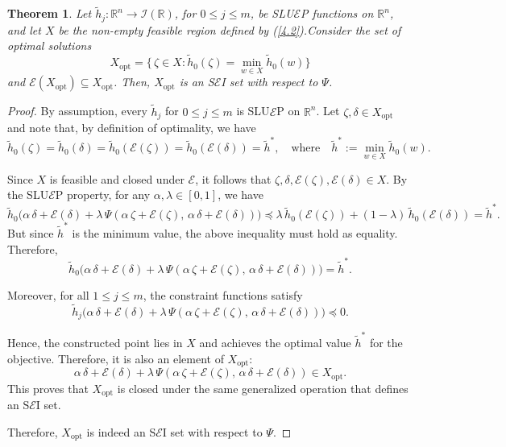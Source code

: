 \documentclass[12pt, reqno]{amsart}
\newtheorem{theorem}{Theorem}[section]
\theoremstyle{definition}
\theoremstyle{remark}
\numberwithin{equation}{section}
\begin{document}
\begin{theorem}
Let $\tilde{h}_{j}: \mathbb{R}^{n} \rightarrow \mathcal{I}(\mathbb{R})$, for $0 \leq j \leq m$, be SLU$\mathcal{E}$P functions on $\mathbb{R}^{n}$, and let $X$ be the non-empty feasible region defined by \emph{(\ref{4.2})}.Consider the set of optimal solutions 
\[
X_{\text{opt}} = \big\{\, \zeta \in X : \tilde{h}_{0}(\zeta) = \min_{w \in X} \tilde{h}_{0}(w) \big\}
\] and $\mathcal{E}(X_{\text{opt}})\subseteq X_{\text{opt}}$. Then, $X_{\text{opt}}$
is an S$\mathcal{E}$I set with respect to $\Psi$.
\end{theorem}

\begin{proof}
By assumption, every $\tilde{h}_{j}$ for $0 \leq j \leq m$ is SLU$\mathcal{E}$P on $\mathbb{R}^{n}$. Let $\mathit{\zeta}, \mathit{\delta} \in X_{\text{opt}}$ and note that, by definition of optimality, we have
\[
\tilde{h}_{0}(\mathit{\zeta}) = \tilde{h}_{0}(\mathit{\delta}) = \tilde{h}_{0}(\mathcal{E}(\mathit{\zeta})) = \tilde{h}_{0}(\mathcal{E}(\mathit{\delta})) = \tilde{h}^{*},
\quad \text{where} \quad 
\tilde{h}^{*} := \min_{w \in X} \tilde{h}_{0}(w).
\]

Since $X$ is feasible and closed under $\mathcal{E}$, it follows that
$\mathit{\zeta}, \mathit{\delta}, \mathcal{E}(\mathit{\zeta}), \mathcal{E}(\mathit{\delta}) \in X$. By the SLU$\mathcal{E}$P property, for any $\alpha, \lambda \in [0,1]$, we have
\[
\tilde{h}_{0}\big( 
\alpha\, \mathit{\delta} + \mathcal{E}(\mathit{\delta})
+ \lambda\, \Psi(
\alpha\, \mathit{\zeta} + \mathcal{E}(\mathit{\zeta}),
\, \alpha\, \mathit{\delta} + \mathcal{E}(\mathit{\delta})
)
\big)
\preceq
\lambda\, \tilde{h}_{0}(\mathcal{E}(\mathit{\zeta})) + (1-\lambda)\, \tilde{h}_{0}(\mathcal{E}(\mathit{\delta})) 
= \tilde{h}^{*}.
\]
But since $\tilde{h}^{*}$ is the minimum value, the above inequality must hold as equality. Therefore,
\[
\tilde{h}_{0}\big(
\alpha\, \mathit{\delta} + \mathcal{E}(\mathit{\delta}) 
+ \lambda\, \Psi(
\alpha\, \mathit{\zeta} + \mathcal{E}(\mathit{\zeta}),
\, \alpha\, \mathit{\delta} + \mathcal{E}(\mathit{\delta})
)
\big) = \tilde{h}^{*}.
\]

Moreover, for all $1 \leq j \leq m$, the constraint functions satisfy
\[
\tilde{h}_{j}\big(
\alpha\, \mathit{\delta} + \mathcal{E}(\mathit{\delta})
+ \lambda\, \Psi(
\alpha\, \mathit{\zeta} + \mathcal{E}(\mathit{\zeta}),
\, \alpha\, \mathit{\delta} + \mathcal{E}(\mathit{\delta})
)
\big) \preceq 0.
\]

Hence, the constructed point lies in $X$ and achieves the optimal value $\tilde{h}^{*}$ for the objective. Therefore, it is also an element of $X_{\text{opt}}$:
\[
\alpha\, \mathit{\delta} + \mathcal{E}(\mathit{\delta})
+ \lambda\, \Psi(
\alpha\, \mathit{\zeta} + \mathcal{E}(\mathit{\zeta}),
\, \alpha\, \mathit{\delta} + \mathcal{E}(\mathit{\delta})
) \in X_{\text{opt}}.
\]
This proves that $X_{\text{opt}}$ is closed under the same generalized operation that defines an S$\mathcal{E}$I set.

Therefore, $X_{\text{opt}}$ is indeed an S$\mathcal{E}$I set with respect to $\Psi$.
\end{proof} 
       	
\end{document}
